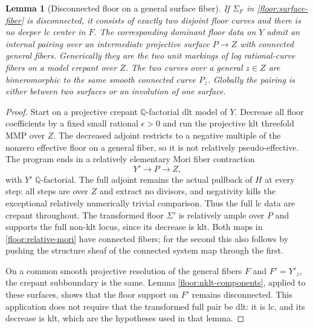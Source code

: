 \documentclass[11pt,letterpaper]{article}
\newcommand{\Q}{\mathbb{Q}}
\newtheorem{lemma}[theorem]{Lemma}
\theoremstyle{definition}
\theoremstyle{remark}
\begin{document}
\begin{lemma}[Disconnected floor on a general surface fiber]
\label{floor:disconnected-fiber}
If $\Sigma_F$ in \eqref{floor:surface-fiber} is
disconnected, it consists of exactly two disjoint
floor curves and there is no deeper lc center in
$F$.  The corresponding dominant floor data on
$Y$ admit an internal pairing over an intermediate
projective surface $P\to Z$ with connected general
fibers.  Generically they are the two unit markings
of log rational-curve fibers on a model crepant
over $Z$.  The two curves over a general $z\in Z$
are bimeromorphic to the same smooth connected
curve $P_z$.  Globally the pairing is either
between two surfaces or an involution of one
surface.
\end{lemma}

\begin{proof}
Start on a projective crepant $\Q$-factorial dlt
model of $Y$.  Decrease all floor coefficients
by a fixed small rational $\epsilon>0$ and run
the projective klt threefold MMP over $Z$.
The decreased adjoint restricts to a negative
multiple of the nonzero effective floor on
a general fiber, so it is not relatively
pseudo-effective.  The program ends in a
relatively elementary Mori fiber contraction
\begin{equation}
 \label{floor:relative-mori}
 Y'\longrightarrow P\longrightarrow Z,
\end{equation}
with $Y'$ $\Q$-factorial.  The full adjoint
remains the actual pullback of $H$ at every
step: all steps are over $Z$ and extract no
divisors, and negativity kills the exceptional
relatively numerically trivial comparison.
Thus the full lc data are crepant throughout.
The transformed floor $\Sigma'$ is relatively
ample over $P$ and supports the full non-klt
locus, since its decrease is klt.  Both maps
in \eqref{floor:relative-mori} have connected
fibers; for the second this also follows by
pushing the structure sheaf of the connected
system map through the first.

On a common smooth projective resolution of
the general fibers $F$ and $F'=Y'_z$, the
crepant subboundary is the same.  Lemma
\ref{floor:nklt-components}, applied to these
surfaces, shows that the floor support on
$F'$ remains disconnected.  This application
does not require that the transformed full
pair be dlt: it is lc, and its decrease is
klt, which are the hypotheses used in that
lemma.


\end{proof}
\end{document}
